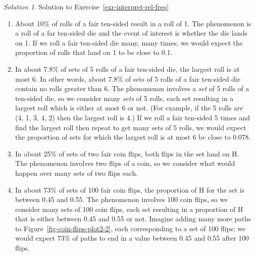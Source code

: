 \documentclass[
  letterpaper,
  DIV=11,
  numbers=noendperiod]{scrreprt}
\providecommand{\tightlist}{%
  \setlength{\itemsep}{0pt}\setlength{\parskip}{0pt}}
\theoremstyle{plain}
\theoremstyle{definition}
\theoremstyle{definition}
\theoremstyle{definition}
\theoremstyle{remark}
\newtheorem{refsolution}{Solution}[chapter]
\begin{document}
\begin{tcolorbox}[enhanced jigsaw, opacityback=0, rightrule=.15mm, coltitle=black, colframe=quarto-callout-tip-color-frame, toprule=.15mm, colbacktitle=quarto-callout-tip-color!10!white, opacitybacktitle=0.6, left=2mm, toptitle=1mm, breakable, title={Solution (click to expand)}, bottomtitle=1mm, colback=white, leftrule=.75mm, titlerule=0mm, arc=.35mm, bottomrule=.15mm]

\begin{refsolution}
Solution to Exercise~\ref{exr-interpret-rel-freq}

\begin{enumerate}
\def\labelenumi{\arabic{enumi}.}
\tightlist
\item
  About 10\% of rolls of a fair ten-sided result in a roll of 1. The
  phenomenon is a roll of a far ten-sided die and the event of interest
  is whether the die lands on 1. If we roll a fair ten-sided die many,
  many times, we would expect the proportion of rolls that land on 1 to
  be close to 0.1.
\item
  In about 7.8\% of sets of 5 rolls of a fair ten-sided die, the largest
  roll is at most 6. In other words, about 7.8\% of sets of 5 rolls of a
  fair ten-sided die contain no rolls greater than 6. The phenomenon
  involves a \emph{set} of 5 rolls of a ten-sided die, so we consider
  many \emph{sets} of 5 rolls, each set resulting in a largest roll
  which is either at most 6 or not. (For example, if the 5 rolls are (4,
  1, 3, 4, 2) then the largest roll is 4.) If we roll a fair ten-sided 5
  times and find the largest roll then repeat to get many sets of 5
  rolls, we would expect the proportion of sets for which the largest
  roll is at most 6 be close to 0.078.
\item
  In about 25\% of sets of two fair coin flips, both flips in the set
  land on H. The phenomenon involves two flips of a coin, so we consider
  what would happen over many sets of two flips each.
\item
  In about 73\% of sets of 100 fair coin flips, the proportion of H for
  the set is between 0.45 and 0.55. The phenomenon involves 100 coin
  flips, so we consider many sets of 100 coin flips, each set resulting
  in a proportion of H that is either between 0.45 and 0.55 or not.
  Imagine adding many more paths to Figure~\ref{fig-coin-flips-plot2-2},
  each corresponding to a set of 100 flips; we would expect 73\% of
  paths to end in a value between 0.45 and 0.55 after 100 flips.
\end{enumerate}

\label{sol-interpret-rel-freq}

\end{refsolution}

\end{tcolorbox}
\end{document}
